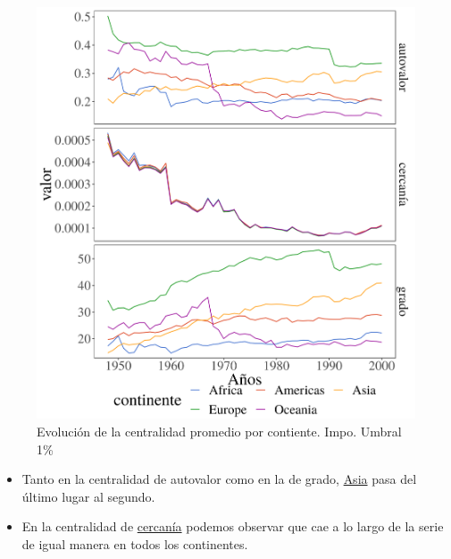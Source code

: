 \documentclass[compress]{beamer}
\begin{document}
\begin{frame}
\begin{figure}
\centering		\includegraphics[width=0.75\linewidth]{1950_2000_continent_all}
\caption{Evolución de la centralidad promedio por contiente. Impo. Umbral 1\%}
\label{fig:centralidad_LP}
\end{figure}
\end{frame}

\begin{frame}
\begin{itemize}[label=\faRebel]
\item Tanto en la centralidad de autovalor como en la de grado, \underline{Asia} pasa del último lugar al segundo. 
\item En la centralidad de \underline{cercanía} podemos observar que cae a lo largo de la serie de igual manera en todos los continentes.
\end{itemize}
\end{frame}
\end{document}
